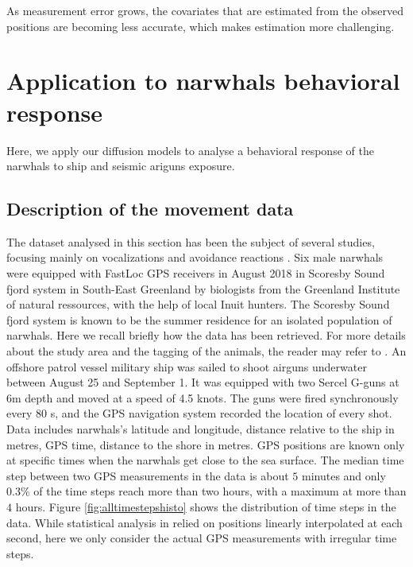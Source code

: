 \documentclass[11pt]{article}
\newcommand {\1}{\mathbb{1}}
\begin{document}
As measurement error grows, the covariates that are estimated from the observed positions are becoming less accurate, which makes estimation more challenging.



\section{Application to narwhals behavioral response}

Here, we apply our diffusion models to analyse a behavioral response of the narwhals to ship and seismic ariguns exposure.

\subsection{Description of the movement data}

The dataset analysed in this section has been the subject of several studies, focusing mainly on vocalizations and avoidance reactions \cite{heide-jorgensen_behavioral_2021,tervo_narwhals_2021}. 
Six male narwhals were equipped with FastLoc GPS receivers in August 2018 in Scoresby Sound fjord system in South-East Greenland by biologists from the Greenland Institute of natural ressources, with the help of local Inuit hunters. The Scoresby Sound fjord system
is known to be the summer residence for an isolated population of narwhals.
Here we recall briefly how the data has been retrieved. For more details about the study area and the tagging of the animals, the reader may refer to \cite{heide-jorgensen_behavioral_2021}. 
An offshore patrol vessel military ship was sailed to shoot airguns underwater between August 25 and September 1. It was equipped with two Sercel G-guns at 6m depth and moved at a speed of 4.5 knots. The guns were fired synchronously every 80 s, and the GPS navigation system recorded the location of every shot. 
Data includes narwhals's latitude and longitude, distance relative to the ship in metres, GPS time, distance to the shore in metres. GPS positions are known only at specific times when the narwhals get close to the sea surface. The median time step between two GPS measurements in the data is about $5$ minutes and only $0.3 \%$ of the time steps reach more than two hours, with a maximum at more than $4$ hours. Figure \ref{fig:alltimestepshisto} shows the distribution of time steps in the data. While statistical analysis in \cite{heide-jorgensen_behavioral_2021} relied on positions linearly interpolated at each second, here we only consider the actual GPS measurements with irregular time steps.
\end{document}
